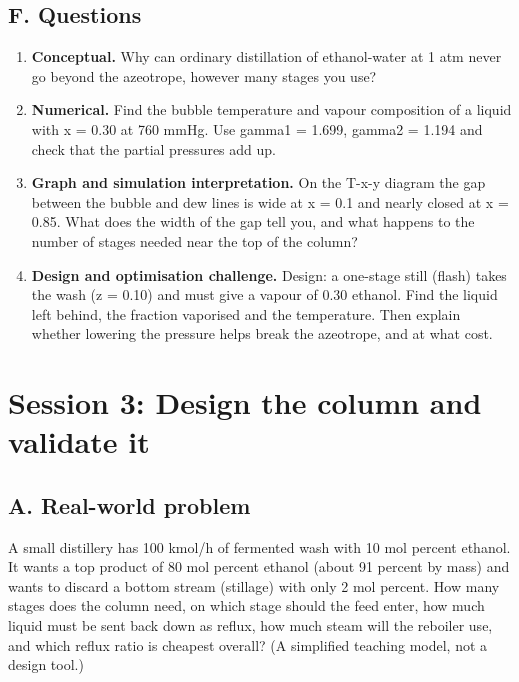 \documentclass[11pt,a4paper]{article}
\begin{document}
\subsection*{F. Questions}
\begin{enumerate}[nosep]
\item \textbf{Conceptual.} Why can ordinary distillation of ethanol-water at 1 atm never go beyond the azeotrope, however many stages you use?
\item \textbf{Numerical.} Find the bubble temperature and vapour composition of a liquid with x = 0.30 at 760 mmHg. Use gamma1 = 1.699, gamma2 = 1.194 and check that the partial pressures add up.
\item \textbf{Graph and simulation interpretation.} On the T-x-y diagram the gap between the bubble and dew lines is wide at x = 0.1 and nearly closed at x = 0.85. What does the width of the gap tell you, and what happens to the number of stages needed near the top of the column?
\item \textbf{Design and optimisation challenge.} Design: a one-stage still (flash) takes the wash (z = 0.10) and must give a vapour of 0.30 ethanol. Find the liquid left behind, the fraction vaporised and the temperature. Then explain whether lowering the pressure helps break the azeotrope, and at what cost.
\end{enumerate}

\section{Session 3: Design the column and validate it}

\subsection*{A. Real-world problem}
A small distillery has 100 kmol/h of fermented wash with 10 mol percent ethanol. It wants a top product of 80 mol percent ethanol (about 91 percent by mass) and wants to discard a bottom stream (stillage) with only 2 mol percent. How many stages does the column need, on which stage should the feed enter, how much liquid must be sent back down as reflux, how much steam will the reboiler use, and which reflux ratio is cheapest overall? (A simplified teaching model, not a design tool.)
\end{document}
